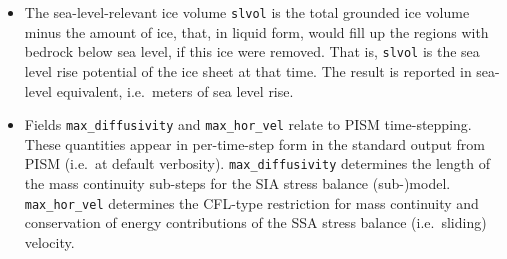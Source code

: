 \begin{itemize}
  \item The sea-level-relevant ice volume \texttt{slvol} is the total grounded ice volume minus the amount of ice, that, in liquid form, would fill up the regions with bedrock below sea level, if this ice were removed.  That is, \texttt{slvol} is the sea level rise potential of the ice sheet at that time.  The result is reported  in sea-level equivalent, i.e.~meters of sea level rise.
  \item Fields \texttt{max_diffusivity} and \texttt{max_hor_vel} relate to PISM time-stepping.  These quantities appear in per-time-step form in the standard output from PISM (i.e.~at default verbosity).  \texttt{max_diffusivity} determines the length of the mass continuity sub-steps for the SIA stress balance (sub-)model.  \texttt{max_hor_vel} determines the CFL-type restriction for mass continuity and conservation of energy contributions of the SSA stress balance (i.e.~sliding) velocity.
\end{itemize}

